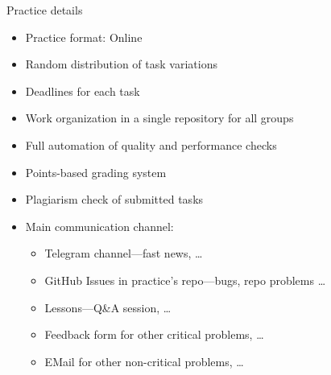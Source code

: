 \documentclass{beamer}
\begin{document}
\begin{frame}{Practice details}
    \begin{itemize}
        \item Practice format: Online
        \item Random distribution of task variations
        \item Deadlines for each task
        \item Work organization in a single repository for all groups
        \item Full automation of quality and performance checks
        \item Points-based grading system
        \item Plagiarism check of submitted tasks
        \item Main communication channel:
            \begin{itemize}
                \item Telegram channel—fast news, \ldots
                \item GitHub Issues in practice's repo—bugs, repo problems \ldots
                \item Lessons—Q\&A session, \ldots
                \item Feedback form for other critical problems, \ldots
                \item EMail for other non-critical problems, \ldots
            \end{itemize}
    \end{itemize}
\end{frame}
\end{document}
